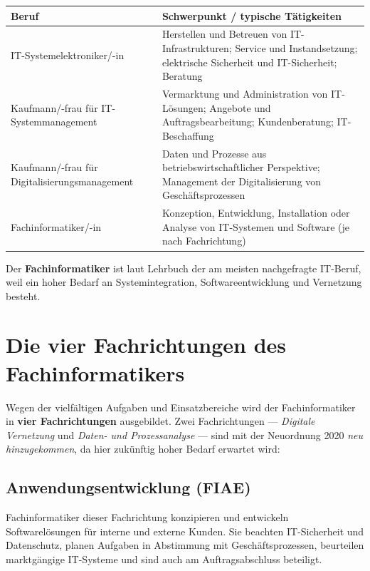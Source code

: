 \documentclass[11pt, a4paper]{article}
\begin{document}
\begin{center}
\begin{tabular}{p{5cm} p{8cm}}
\toprule
\textbf{Beruf} & \textbf{Schwerpunkt / typische Tätigkeiten}\\
\midrule
IT-Systemelektroniker/-in & Herstellen und Betreuen von IT-Infrastrukturen; Service und Instandsetzung; elektrische Sicherheit und IT-Sicherheit; Beratung\\
Kaufmann/-frau für IT-Systemmanagement & Vermarktung und Administration von IT-Lösungen; Angebote und Auftragsbearbeitung; Kundenberatung; IT-Beschaffung\\
Kaufmann/-frau für Digitalisierungsmanagement & Daten und Prozesse aus betriebswirtschaftlicher Perspektive; Management der Digitalisierung von Geschäftsprozessen\\
Fachinformatiker/-in & Konzeption, Entwicklung, Installation oder Analyse von IT-Systemen und Software (je nach Fachrichtung)\\
\bottomrule
\end{tabular}
\end{center}

\begin{merksatz}
Der \textbf{Fachinformatiker} ist laut Lehrbuch der am meisten nachgefragte IT-Beruf,
weil ein hoher Bedarf an Systemintegration, Softwareentwicklung und Vernetzung besteht.
\end{merksatz}

\section{Die vier Fachrichtungen des Fachinformatikers}

Wegen der vielfältigen Aufgaben und Einsatzbereiche wird der Fachinformatiker in
\textbf{vier Fachrichtungen} ausgebildet. Zwei Fachrichtungen --- \emph{Digitale
Vernetzung} und \emph{Daten- und Prozessanalyse} --- sind mit der Neuordnung 2020
\emph{neu hinzugekommen}, da hier zukünftig hoher Bedarf erwartet wird:

\subsection{Anwendungsentwicklung (FIAE)}

Fachinformatiker dieser Fachrichtung konzipieren und entwickeln Softwarelösungen für
interne und externe Kunden. Sie beachten IT-Sicherheit und Datenschutz, planen Aufgaben
in Abstimmung mit Geschäftsprozessen, beurteilen marktgängige IT-Systeme und sind auch
am Auftragsabschluss beteiligt.
\end{document}

